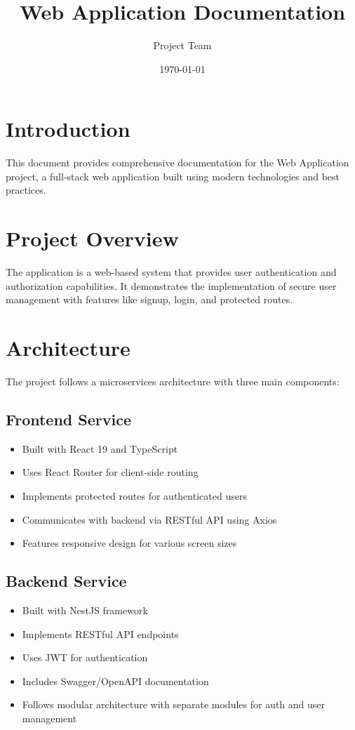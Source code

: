 \documentclass{article}
\title{Web Application Documentation}
\author{Project Team}
\date{\today}
\begin{document}
\maketitle

\section{Introduction}
This document provides comprehensive documentation for the Web Application project, a full-stack web application built using modern technologies and best practices.

\section{Project Overview}
The application is a web-based system that provides user authentication and authorization capabilities. It demonstrates the implementation of secure user management with features like signup, login, and protected routes.

\section{Architecture}
The project follows a microservices architecture with three main components:

\subsection{Frontend Service}
\begin{itemize}
    \item Built with React 19 and TypeScript
    \item Uses React Router for client-side routing
    \item Implements protected routes for authenticated users
    \item Communicates with backend via RESTful API using Axios
    \item Features responsive design for various screen sizes
\end{itemize}

\subsection{Backend Service}
\begin{itemize}
    \item Built with NestJS framework
    \item Implements RESTful API endpoints
    \item Uses JWT for authentication
    \item Includes Swagger/OpenAPI documentation
    \item Follows modular architecture with separate modules for auth and user management
\end{itemize}
\end{document}
